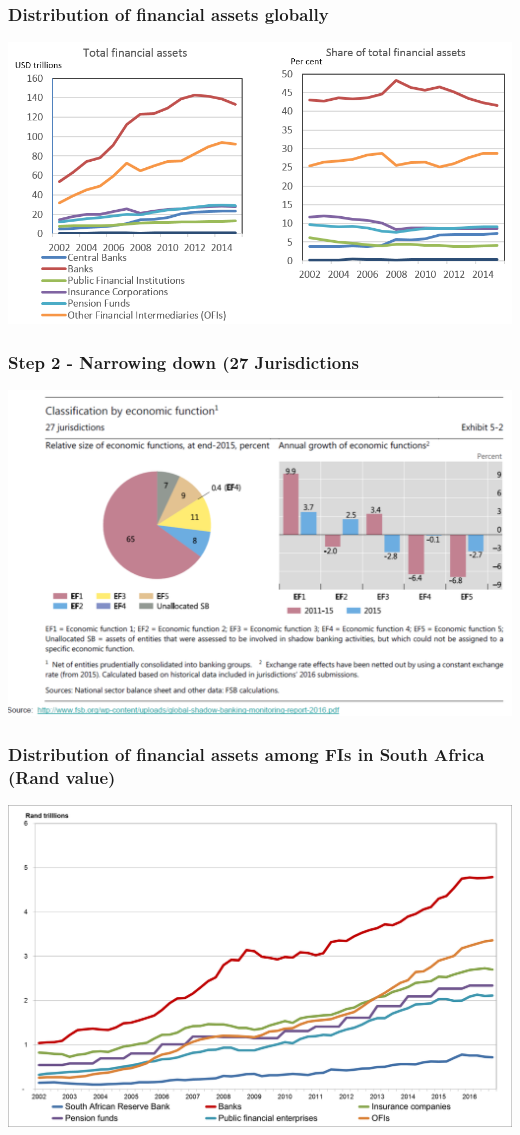 \documentclass[11pt]{beamer}
\begin{document}
\begin{frame}
\frametitle{Distribution of financial assets globally}
\includegraphics[width=\textwidth]{shadowbank5.png}
\end{frame}



\begin{frame}
\frametitle{Step 2 - Narrowing down (27 Jurisdictions}
\includegraphics[width=\textwidth]{shadowbank6.png}
\end{frame}
\begin{frame}
\frametitle{Distribution of financial assets among FIs in South Africa (Rand value)}
\includegraphics[width=\textwidth]{shadowbank7.png}
\end{frame}
\end{document}
